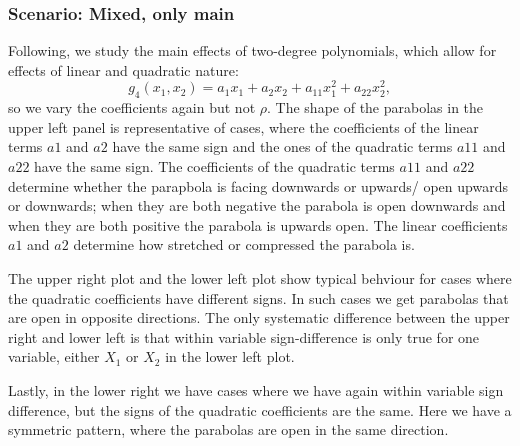 \subsubsection*{Scenario: Mixed, only main}
Following, we study the main effects of two-degree polynomials, which allow for effects of linear and quadratic nature:
\[
g_4(x_1, x_2) = a_1 x_1 + a_2 x_2 + a_{11} x_1^2 + a_{22} x_2^2,
\]
so we vary the coefficients again but not $\rho$.
The shape of the parabolas in the upper left panel is representative of cases, where the coefficients of the linear terms $a1$ and $a2$ have the same sign and the ones of the quadratic terms $a11$ and $a22$ have the same sign.
The coefficients of the quadratic terms $a11$ and $a22$ determine whether the parapbola is facing downwards or upwards/ open upwards or downwards; when they are both negative the parabola is open downwards and when they are both positive the parabola is upwards open. The linear coefficients $a1$ and $a2$ determine how stretched or compressed the parabola is.\par
The upper right plot and the lower left plot show typical behviour for cases where the quadratic coefficients have different signs. In such cases we get parabolas that are open in opposite directions. The only systematic difference between the upper right and lower left is that within variable sign-difference is only true for one variable, either $X_1$ or $X_2$ in the lower left plot.\par
Lastly, in the lower right we have cases where we have again within variable sign difference, but the signs of the quadratic coefficients are the same. Here we have a symmetric pattern, where the parabolas are open in the same direction.


